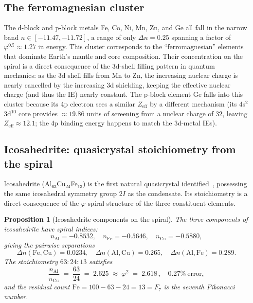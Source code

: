 \documentclass[11pt,a4paper]{article}
\newtheorem{proposition}[theorem]{Proposition}
\theoremstyle{definition}
\theoremstyle{remark}
\newcommand{\vp}{\varphi}
\begin{document}
\subsection{The ferromagnesian cluster}

The d-block and p-block metals Fe, Co, Ni, Mn, Zn, and Ge
all fall in the narrow band $n \in [-11.47, -11.72]$,
a range of only $\Delta n = 0.25$ spanning a factor of
$\vp^{0.5} \approx 1.27$ in energy.
This cluster corresponds to the ``ferromagnesian'' elements
that dominate Earth's mantle and core composition.
Their concentration on the spiral is a direct consequence of the
3d-shell filling pattern in quantum mechanics:
as the 3d shell fills from Mn to Zn,
the increasing nuclear charge is nearly cancelled by the increasing
3d shielding, keeping the effective nuclear charge
(and thus the IE) nearly constant.
The p-block element Ge falls into this cluster because its
4p electron sees a similar $Z_\mathrm{eff}$ by a different mechanism
(its 4s$^2$3d$^{10}$ core provides $\approx 19.86$ units of screening
from a nuclear charge of 32, leaving $Z_\mathrm{eff} \approx 12.1$;
the 4p binding energy happens to match the 3d-metal IEs).


\subsection{Icosahedrite: quasicrystal stoichiometry from the spiral}
\label{P11:sec:icosahedrite}

Icosahedrite (Al$_{63}$Cu$_{24}$Fe$_{13}$) is the first natural quasicrystal
identified~\cite{Bindi2009}, possessing the same icosahedral symmetry group
$2I$ as the condensate.
Its stoichiometry is a direct consequence of the $\vp$-spiral structure
of the three constituent elements.

\begin{proposition}[Icosahedrite components on the spiral]
\label{P11:prop:icosahedrite}
The three components of icosahedrite have spiral indices:
\begin{equation}
  n_{\mathrm{Al}} = -0.8532, \quad
  n_{\mathrm{Fe}} = -0.5646, \quad
  n_{\mathrm{Cu}} = -0.5880,
  \label{P11:eq:icosahedrite_indices}
\end{equation}
giving the pairwise separations
\begin{equation}
  \Delta n(\mathrm{Fe,Cu}) = 0.0234, \quad
  \Delta n(\mathrm{Al,Cu}) = 0.265, \quad
  \Delta n(\mathrm{Al,Fe}) = 0.289.
  \label{P11:eq:icosahedrite_deltas}
\end{equation}
The stoichiometry $63:24:13$ satisfies
\begin{equation}
  \boxed{\frac{n_{\mathrm{Al}}}{n_{\mathrm{Cu}}} \;=\; \frac{63}{24}
  \;=\; 2.625 \;\approx\; \vp^2 \;=\; 2.618\,,\quad
  0.27\%\ \text{error},}
  \label{P11:eq:icosahedrite_phi2}
\end{equation}
and the residual count $\mathrm{Fe} = 100 - 63 - 24 = 13 = F_7$
is the seventh Fibonacci number.
\end{proposition}
\end{document}
